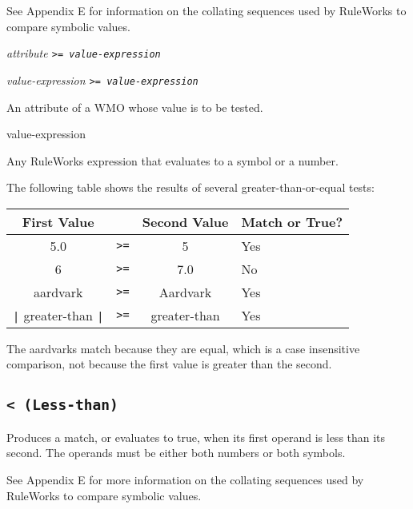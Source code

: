 See Appendix E for information on the collating sequences used by
RuleWorks to compare symbolic values.

\Format

\ct\it{attribute} \tt{>=} \it{value-expression}

\it{value-expression} \tt{>=} \it{value-expression}

\begin{operands}

\item[\ct{attribute}]

  An attribute of a WMO whose value is to be tested.

\item[value-expression]

  Any RuleWorks expression that evaluates to a symbol or a number.
\end{operands}

\Example

The following table shows the results of several greater-than-or-equal
tests:

\begin{tabularx}{\columnwidth}{cccX}
  \toprule
  First Value      &    & Second Value & Match or True? \\    
  \midrule
  5.0              & \verb|>=| & 5            & Yes            \\
  6                & \verb|>=| & 7.0          & No             \\
  aardvark         & \verb|>=| & Aardvark     & Yes            \\
  \verb,|, greater-than \verb,|, & \verb|>=| & greater-than & Yes            \\
  \bottomrule
\end{tabularx}

The aardvarks match because they are equal, which is a case
insensitive comparison, not because the first value is greater than
the second.

\subsection{\tt< (Less-than)}

Produces a match, or evaluates to true, when its first operand is less
than its second. The operands must be either both numbers or both
symbols.

See Appendix E for more information on the collating sequences used by
RuleWorks to compare symbolic values.

